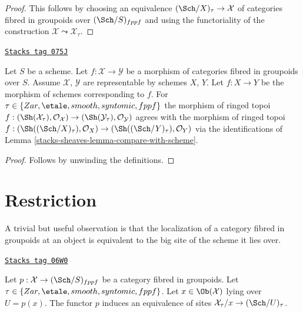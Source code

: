 \begin{proof}
This follows by choosing an equivalence
$(\Sch/X)_\tau \to \mathcal{X}$ of categories fibred in groupoids
over $(\Sch/S)_{fppf}$ and using the functoriality of
the construction $\mathcal{X} \leadsto \mathcal{X}_\tau$.
\end{proof}

\begin{lemma}
\label{stacks-sheaves-lemma-compare-with-morphism-of-schemes}
\href{https://stacks.math.columbia.edu/tag/075J}{\texttt{Stacks tag 075J}}

Let $S$ be a scheme. Let $f : \mathcal{X} \to \mathcal{Y}$ be a morphism
of categories fibred in groupoids over $S$.
Assume $\mathcal{X}$, $\mathcal{Y}$ are representable by schemes
$X$, $Y$. Let $f : X \to Y$ be the morphism of schemes corresponding
to $f$. For $\tau \in \{Zar,\linebreak[0] \etale,\linebreak[0]
smooth,\linebreak[0] syntomic,\linebreak[0] fppf\}$
the morphism of ringed topoi
$f : (\Sh(\mathcal{X}_\tau), \mathcal{O}_\mathcal{X}) \to
(\Sh(\mathcal{Y}_\tau), \mathcal{O}_\mathcal{Y})$
agrees with the morphism of ringed topoi
$f : (\Sh((\Sch/X)_\tau), \mathcal{O}_X) \to
(\Sh((\Sch/Y)_\tau), \mathcal{O}_Y)$ via the identifications of
Lemma \ref{stacks-sheaves-lemma-compare-with-scheme}.
\end{lemma}

\begin{proof}
Follows by unwinding the definitions.
\end{proof}

\section{Restriction}
\label{stacks-sheaves-section-restriction}
A trivial but useful observation is that the localization
of a category fibred in groupoids at an object
is equivalent to the big site of the scheme it lies over.

\begin{lemma}[Localizing]
\label{stacks-sheaves-lemma-localizing}
\href{https://stacks.math.columbia.edu/tag/06W0}{\texttt{Stacks tag 06W0}}

Let $p : \mathcal{X} \to (\Sch/S)_{fppf}$ be a category fibred
in groupoids. Let $\tau \in \{Zar, \etale, smooth, syntomic, fppf\}$.
Let $x \in \Ob(\mathcal{X})$ lying over $U = p(x)$.
The functor $p$ induces an equivalence of sites
$\mathcal{X}_\tau/x \to (\Sch/U)_\tau$.
\end{lemma}

